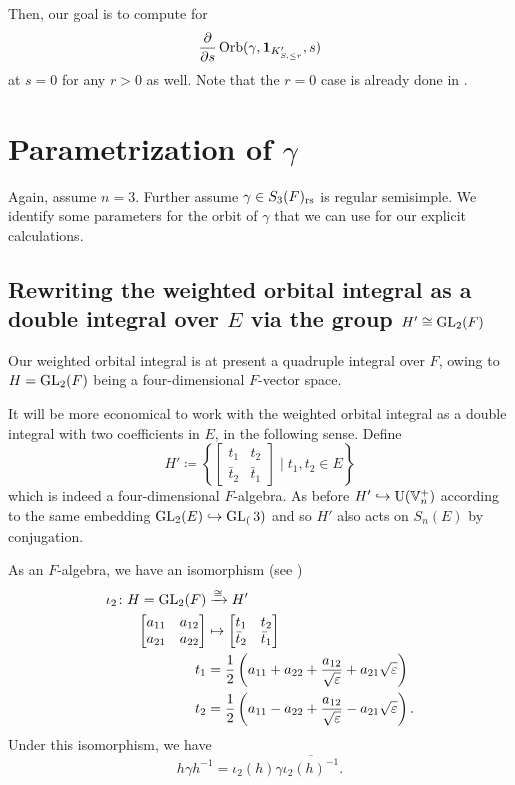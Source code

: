 Then, our goal is to compute for
\begin{equation}
  \pdv{}{s}\operatorname{Orb}(\gamma, \mathbf{1}_{K'_{S, \le r}}, s)
  \label{eq:orbital_goal}
\end{equation}
at $s=0$ for any $r > 0$ as well.
Note that the $r = 0$ case is already done in \cite{ref:AFL}.

\section{Parametrization of $\gamma$}
Again, assume $n = 3$.
Further assume $\gamma \in S_3(F)_{\mathrm{rs}}$ is regular semisimple.
We identify some parameters for the orbit of $\gamma$
that we can use for our explicit calculations.

\subsection{Rewriting the weighted orbital integral as a double integral over $E$
  via the group $H' \cong \operatorname{GL}_2(F)$}
Our weighted orbital integral is at present a quadruple integral over $F$,
owing to $H = \operatorname{GL}_{2}(F)$ being a four-dimensional $F$-vector space.

It will be more economical to work with the weighted orbital integral as a double integral
with two coefficients in $E$, in the following sense.
Define
\[ H' \coloneqq
  \left\{ \begin{bmatrix} t_1 & t_2 \\ \bar t_2 & \bar t_1 \end{bmatrix}
    \mid t_1, t_2 \in E \right\}
\]
which is indeed a four-dimensional $F$-algebra.
As before $H' \hookrightarrow \operatorname{U}(\mathbb V_n^+)$ according to the same embedding
$\operatorname{GL}_2(E) \hookrightarrow \operatorname{GL}_(3)$
and so $H'$ also acts on $S_n(E)$ by conjugation.

As an $F$-algebra, we have an isomorphism (see \cite[\S4.1]{ref:AFL})
\begin{align*}
  \iota_2 \colon H = \operatorname{GL}_2(F)
  &\xrightarrow{\cong} H' \\
  \begin{bmatrix} a_{11} & a_{12} \\ a_{21} & a_{22} \end{bmatrix}
  &\mapsto \begin{bmatrix} t_1 & t_2 \\ \bar t_2 & \bar t_1 \end{bmatrix} \\
  t_1 &= \frac{1}{2}\left( a_{11} + a_{22} + \frac{a_{12}}{\sqrt{\varepsilon}} + a_{21} \sqrt{\varepsilon} \right) \\
  t_2 &= \frac{1}{2}\left( a_{11} - a_{22} + \frac{a_{12}}{\sqrt{\varepsilon}} - a_{21} \sqrt{\varepsilon} \right).
\end{align*}
Under this isomorphism, we have
\[ h \gamma h^{-1} = \iota_2(h) \gamma \overline{\iota_2(h)^{-1}}. \]

